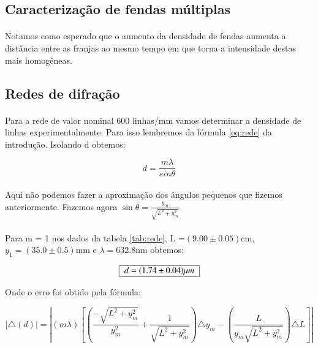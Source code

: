 \documentclass[a4paper,11pt]{article}
\newcommand{\MyBox}[1]
{
	\begin{tabular}{|l|}\hline
	  #1 \\ \hline	    
	\end{tabular} 	
}
\begin{document}
\subsection{Caracterização de fendas múltiplas}
\paragraph{}Notamos como esperado que o aumento da densidade
de fendas aumenta a distância entre as franjas ao mesmo
tempo em que torna a intensidade destas mais homogêneas.


\paragraph{}

\subsection{Redes de difração}
\paragraph{}Para a rede de valor nominal 600 linhas/mm vamos determinar
a densidade de linhas experimentalmente. Para isso lembremos da fórmula 
\ref{eq:rede} da introdução. Isolando d obtemos:

\begin{equation}
	d = \frac{m \lambda}{sin \theta}
\end{equation}

\paragraph{}Aqui não podemos fazer a aproximação dos ângulos pequenos
que fizemos anteriormente. Fazemos agora
 $\sin \theta =\frac{y_m}{\sqrt{L^2 +y_m^2 }}$
\paragraph{}
Para m = 1 nos dados da tabela \ref{tab:rede}, L =$ (9.00 \pm 0.05)$cm, $y_1 = (35.0 \pm0.5)$mm e $\lambda = 632.8$nm obtemos:

\begin{equation}
\MyBox{	$d = (1.74 \pm 0.04)\mu m$}
\end{equation}

Onde o erro foi obtido pela fórmula:
 
\begin{equation}
	|\triangle(d)| =|(m \lambda) 
		\left[
		  \left(
			\frac{-\sqrt{L^2 + y_m^2}}{y_m^2} + \frac{1}{\sqrt{L^2 + y_m^2}}	 
		  \right)\triangle y_m			
	-	\left(
			\frac{L}{y_m\sqrt{L^2 + y_m^2}}
		\right) \triangle L
		\right] |
\end{equation}
\end{document}
